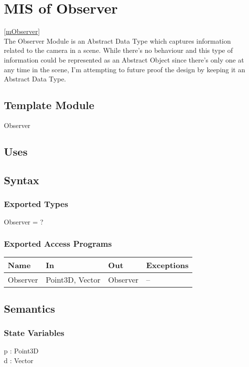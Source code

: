 \documentclass[12pt, titlepage]{article}
\begin{document}
\newpage

\section{MIS of Observer} \ref{mObserver} \\
The Observer Module is an Abstract Data Type which captures information related 
to the camera in a scene. While there's no behaviour and this type of 
information could be represented as an Abstract Object since there's only one 
at any time in the scene, I'm attempting to future proof the design by keeping 
it an Abstract Data Type.

\subsection{Template Module}
Observer

\subsection{Uses}

\subsection{Syntax}
\subsubsection{Exported Types}
Observer = ?
\subsubsection{Exported Access Programs}
\begin{center}
	\begin{tabular}{p{3cm} p{4cm} p{2cm} p{4cm}}
		\hline
		\textbf{Name} & \textbf{In} & \textbf{Out} & \textbf{Exceptions} \\
		\hline
		Observer & Point3D, Vector & Observer & -- \\
		\hline
	\end{tabular}
\end{center}

\subsection{Semantics}
\subsubsection{State Variables}
p : Point3D\\
d : Vector\\
\end{document}
